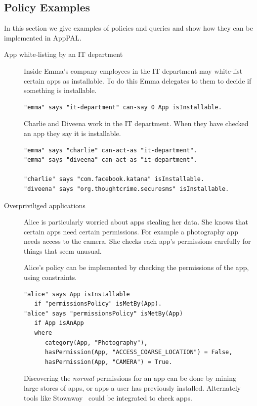 \documentclass[twoside,letterpaper]{soups}
\begin{document}
\subsection{Policy Examples}
\label{ssec:idioms}

In this section we give examples of policies and queries and show how they can be implemented in AppPAL.

\begin{description}
  \item[App white-listing by an IT department]
    Inside Emma's company employees in the IT department may white-list certain apps as installable.
    To do this Emma delegates to them to decide if something is installable.
    \begin{lstlisting}
"emma" says "it-department" can-say 0 App isInstallable.
    \end{lstlisting}
    Charlie and Diveena work in the IT department.
    When they have checked an app they say it is installable.
    \begin{lstlisting}
"emma" says "charlie" can-act-as "it-department".
"emma" says "diveena" can-act-as "it-department".

"charlie" says "com.facebook.katana" isInstallable.
"diveena" says "org.thoughtcrime.securesms" isInstallable.
    \end{lstlisting}

  \item[Overpriviliged applications]
    Alice is particularly worried about apps stealing her data.
    She knows that certain apps need certain permissions.
    For example a photography app needs access to the camera.
    She checks each app's permissions carefully for things that seem unusual.

    Alice's policy can be implemented by checking the permissions of the app, using constraints.
    \begin{lstlisting}
"alice" says App isInstallable
   if "permissionsPolicy" isMetBy(App).
"alice" says "permissionsPolicy" isMetBy(App)
   if App isAnApp
   where
      category(App, "Photography"),
      hasPermission(App, "ACCESS_COARSE_LOCATION") = False,
      hasPermission(App, "CAMERA") = True.
    \end{lstlisting}

    Discovering the \emph{normal} permissions for an app can be done by mining large stores of apps, or apps a user has previously installed.
    Alternately tools like Stowaway~\citep{Felt:2011kj} could be integrated to check apps.


\end{description}
\end{document}
